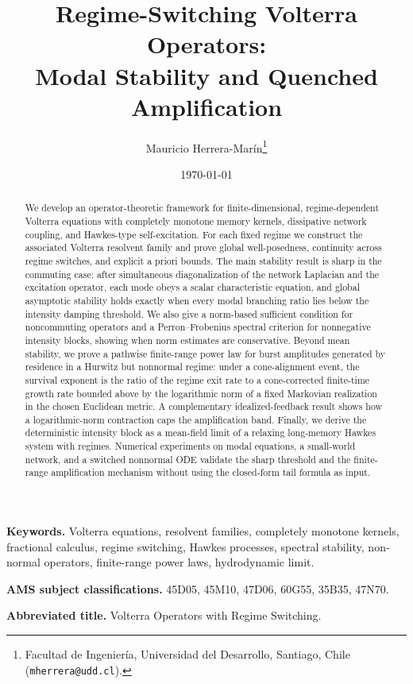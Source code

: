 \documentclass[11pt]{article}
\title{\bfseries Regime-Switching Volterra Operators:\\
Modal Stability and Quenched Amplification}
\author{Mauricio Herrera-Mar\'in\thanks{Facultad de Ingenier\'ia,
Universidad del Desarrollo, Santiago, Chile (\texttt{mherrera@udd.cl}).}}
\date{\today}
\theoremstyle{plain}
\theoremstyle{definition}
\theoremstyle{remark}
\begin{document}
\maketitle


\begin{abstract}
We develop an operator-theoretic framework for finite-dimensional, regime-dependent Volterra
equations with completely monotone memory kernels, dissipative network coupling, and Hawkes-type
self-excitation. For each fixed regime we construct the associated Volterra resolvent family and
prove global well-posedness, continuity across regime switches, and explicit a priori bounds. The
main stability result is sharp in the commuting case: after simultaneous diagonalization of the
network Laplacian and the excitation operator, each mode obeys a scalar characteristic equation,
and global asymptotic stability holds exactly when every modal branching ratio lies below the
intensity damping threshold. We also give a norm-based sufficient condition for noncommuting
operators and a Perron--Frobenius spectral criterion for nonnegative intensity blocks, showing when
norm estimates are conservative. Beyond mean stability, we prove a pathwise finite-range power law
for burst amplitudes generated by residence in a Hurwitz but nonnormal regime: under a
cone-alignment event, the survival exponent is the ratio of the regime exit rate to a
cone-corrected finite-time growth rate bounded above by the logarithmic norm of a fixed
Markovian realization in the chosen Euclidean metric. A complementary idealized-feedback result
shows how a logarithmic-norm contraction caps
the amplification band. Finally, we derive the deterministic intensity block as a mean-field limit
of a relaxing long-memory Hawkes system with regimes. Numerical experiments on modal equations, a
small-world network, and a switched nonnormal ODE validate the sharp threshold and the
finite-range amplification mechanism without using the closed-form tail formula as input.
\end{abstract}

\noindent\textbf{Keywords.} Volterra equations, resolvent families, completely monotone kernels,
fractional calculus, regime switching, Hawkes processes, spectral stability, non-normal
operators, finite-range power laws, hydrodynamic limit.

\medskip
\noindent\textbf{AMS subject classifications.} 45D05, 45M10, 47D06, 60G55, 35B35, 47N70.

\medskip
\noindent\textbf{Abbreviated title.} Volterra Operators with Regime Switching.
\end{document}
